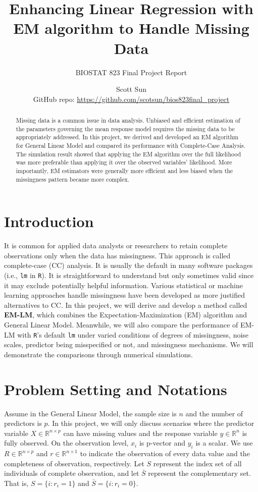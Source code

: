 \documentclass[
  twocolumn]{article}
\title{\textbf{Enhancing Linear Regression with EM algorithm to Handle
Missing Data}}
\subtitle{BIOSTAT 823 Final Project Report}
\author{Scott Sun\\
GitHub repo: \url{https://github.com/scotsun/bios823final_project}}
\date{}
\begin{document}
\maketitle
\begin{abstract}
Missing data is a common issue in data analysis. Unbiased and efficient
estimation of the parameters governing the mean response model requires
the missing data to be appropriately addressed. In this project, we
derived and developed an EM algorithm for General Linear Model and
compared its performance with Complete-Case Analysis. The simulation
result showed that applying the EM algorithm over the full likelihood
was more preferable than applying it over the observed variables'
likelihood. More importantly, EM estimators were generally more
efficient and less biased when the missingness pattern became more
complex.
\end{abstract}

\hypertarget{introduction}{%
\section{Introduction}\label{introduction}}

It is common for applied data analysts or researchers to retain complete
observations only when the data has missingness. This approach is called
complete-case (CC) analysis. It is usually the default in many software
packages (i.e., \texttt{lm} in \texttt{R}). It is straightforward to
understand but only sometimes valid since it may exclude potentially
helpful information. Various statistical or machine learning approaches
handle missingness have been developed as more justified alternatives to
CC. In this project, we will derive and develop a method called
\textbf{EM-LM}, which combines the Expectation-Maximization (EM)
algorithm and General Linear Model. Meanwhile, we will also compare the
performance of EM-LM with \texttt{R}'s default \texttt{lm} under varied
conditions of degrees of missingness, noise scales, predictor being
misspecified or not, and missingness mechanisms. We will demonstrate the
comparisons through numerical simulations.

\hypertarget{problem-setting-and-notations}{%
\section{Problem Setting and
Notations}\label{problem-setting-and-notations}}

Assume in the General Linear Model, the sample size is \(n\) and the
number of predictors is \(p\). In this project, we will only discuss
scenarios where the predictor variable \(X \in \mathbb{R}^{n \times p}\)
can have missing values and the response variable \(y \in \mathbb{R}^n\)
is fully observed. On the observation level, \(x_i\) is p-vector and
\(y_i\) is a scalar. We use \(R \in \mathbb{R}^{n \times p}\) and
\(r \in \mathbb{R}^{n \times 1}\) to indicate the observation of every
data value and the completeness of observation, respectively. Let \(S\)
represent the index set of all individuals of complete observation, and
let \(\bar{S}\) represent the complementary set. That is,
\(S = \{i: r_i = 1\}\) and \(\bar{S} = \{i: r_i = 0\}\).
\end{document}
